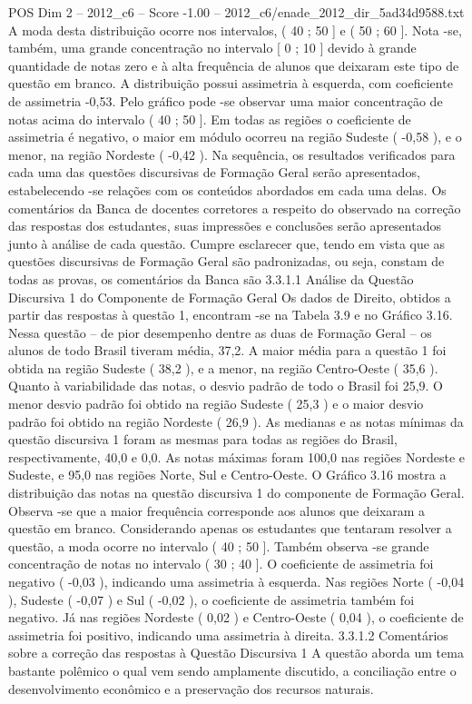 \begin{textsample}{POS Dim 2 – 2012\_c6 – Score -1.00 – 2012\_c6/enade\_2012\_dir\_5ad34d9588.txt}
A moda desta distribuição ocorre nos intervalos, ( 40 ; 50 ] e ( 50 ; 60 ].
Nota -se, também, uma grande concentração no intervalo [ 0 ; 10 ] devido à grande quantidade de notas zero e à alta frequência de alunos que deixaram este tipo de questão em branco.
A distribuição possui assimetria à esquerda, com coeficiente de assimetria -0,53.
Pelo gráfico pode -se observar uma maior concentração de notas acima do intervalo ( 40 ; 50 ].
Em todas as regiões o coeficiente de assimetria é negativo, o maior em módulo ocorreu na região Sudeste ( -0,58 ), e o menor, na região Nordeste ( -0,42 ).
Na sequência, os resultados verificados para cada uma das questões discursivas de Formação Geral serão apresentados, estabelecendo -se relações com os conteúdos abordados em cada uma delas.
Os comentários da Banca de docentes corretores a respeito do observado na correção das respostas dos estudantes, suas impressões e conclusões serão apresentados junto à análise de cada questão.
Cumpre esclarecer que, tendo em vista que as questões discursivas de Formação Geral são padronizadas, ou seja, constam de todas as provas, os comentários da Banca são 3.3.1.1 Análise da Questão Discursiva 1 do Componente de Formação Geral Os dados de Direito, obtidos a partir das respostas à questão 1, encontram -se na Tabela 3.9 e no Gráfico 3.16.
Nessa questão – de pior desempenho dentre as duas de Formação Geral – os alunos de todo Brasil tiveram média, 37,2.
A maior média para a questão 1 foi obtida na região Sudeste ( 38,2 ), e a menor, na região Centro-Oeste ( 35,6 ).
Quanto à variabilidade das notas, o desvio padrão de todo o Brasil foi 25,9.
O menor desvio padrão foi obtido na região Sudeste ( 25,3 ) e o maior desvio padrão foi obtido na região Nordeste ( 26,9 ).
As medianas e as notas mínimas da questão discursiva 1 foram as mesmas para todas as regiões do Brasil, respectivamente, 40,0 e 0,0.
As notas máximas foram 100,0 nas regiões Nordeste e Sudeste, e 95,0 nas regiões Norte, Sul e Centro-Oeste.
O Gráfico 3.16 mostra a distribuição das notas na questão discursiva 1 do componente de Formação Geral.
Observa -se que a maior frequência corresponde aos alunos que deixaram a questão em branco.
Considerando apenas os estudantes que tentaram resolver a questão, a moda ocorre no intervalo ( 40 ; 50 ].
Também observa -se grande concentração de notas no intervalo ( 30 ; 40 ].
O coeficiente de assimetria foi negativo ( -0,03 ), indicando uma assimetria à esquerda.
Nas regiões Norte ( -0,04 ), Sudeste ( -0,07 ) e Sul ( -0,02 ), o coeficiente de assimetria também foi negativo.
Já nas regiões Nordeste ( 0,02 ) e Centro-Oeste ( 0,04 ), o coeficiente de assimetria foi positivo, indicando uma assimetria à direita. 3.3.1.2 Comentários sobre a correção das respostas à Questão Discursiva 1 A questão aborda um tema bastante polêmico o qual vem sendo amplamente discutido, a conciliação entre o desenvolvimento econômico e a preservação dos recursos naturais.

\end{textsample}
